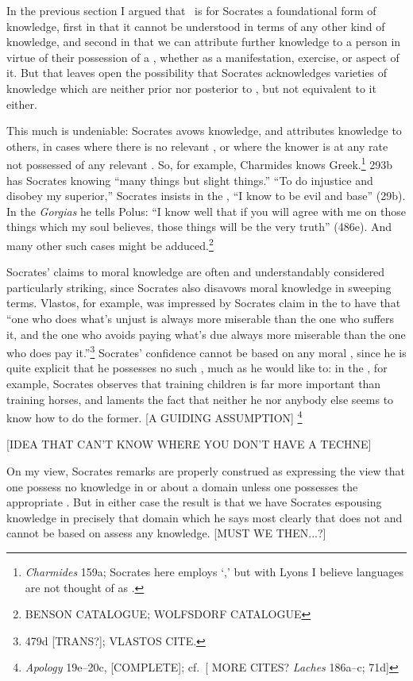 \documentclass[11pt,letterpaper,oneside]{amsart} %
\begin{document}
In the previous section I argued that \techne\ is for Socrates a foundational form of knowledge, first in that it cannot be understood in terms of any other kind of knowledge, and second in that we can attribute further knowledge to a person in virtue of their possession of a \techne, whether as a manifestation, exercise, or aspect of it. But that leaves open the possibility that Socrates acknowledges varieties of knowledge which are neither prior nor posterior to \techne, but not equivalent to it either.

This much is undeniable: Socrates avows knowledge, and attributes knowledge to others, in cases where there is no relevant \techne, or where the knower is at any rate not possessed of any relevant \techne. So, for example, Charmides knows Greek.\footnote{\emph{Charmides} 159a; Socrates here employs `\epistasthai,' but with Lyons I believe languages are not thought of as \technai.}  293b has Socrates knowing ``many things but slight things.'' ``To do injustice and disobey my superior,'' Socrates insists in the , ``I know to be evil and base'' (29b). In the \emph{Gorgias} he tells Polus: ``I know well that if you will agree with me on those things which my soul believes, those things will be the very truth'' (486e). And many other such cases might be adduced.\footnote{BENSON CATALOGUE; WOLFSDORF CATALOGUE} 


Socrates' claims to moral knowledge are often and understandably considered particularly striking, since Socrates also disavows moral knowledge in sweeping terms. Vlastos, for example, was impressed by Socrates claim in the  to have  that  ``one who does what's unjust is always more miserable than the one who suffers it, and the one who avoids paying what's due always more miserable than the one who does pay it.''\footnote{479d [TRANS?]; VLASTOS CITE.} Socrates' confidence cannot be based on any moral \techne, since he is quite explicit that he possesses no such \techne, much as he would like to: in the , for example, Socrates observes that training children is far more important than training horses, and laments the fact that neither he nor anybody else seems to know how to do the former. [A GUIDING ASSUMPTION] \footnote{\emph{Apology} 19e--20c, [COMPLETE]; cf.\ [ MORE CITES? \emph{Laches} 186a--c;  71d]} 


[IDEA THAT CAN'T KNOW WHERE YOU DON'T HAVE A TECHNE]

On my view, Socrates remarks are properly construed as expressing the view that one possess no knowledge in or about a domain unless one possesses the appropriate \techne. But in either case the result is that we have Socrates espousing knowledge in precisely that domain which he says most clearly that does not and cannot be based on assess any knowledge. [MUST WE THEN...?] 
\end{document}
